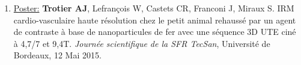 \begin{enumerate}
\item \underline{Poster:} \textbf{Trotier AJ}, Lefrançois W, Castets CR, Franconi J, Miraux S. IRM cardio-vasculaire haute résolution chez le petit animal rehaussé par un agent de contraste à base de nanoparticules de fer avec une séquence 3D UTE ciné à 4,7/7 et 9,4T. \textit{Journée scientifique de la SFR TecSan}, Université de Bordeaux, 12 Mai 2015.

\end{enumerate}